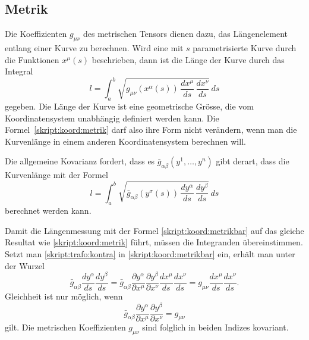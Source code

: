 \subsection{Metrik}
Die Koeffizienten $g_{\mu\nu}$ des metrischen Tensors dienen dazu,
das Längenelement entlang einer Kurve zu berechnen.
Wird eine mit $s$ parametrisierte Kurve durch die Funktionen
$x^\mu(s)$ beschrieben, dann ist die Länge der Kurve durch das
Integral
\begin{equation}
l = \int_a^b
\sqrt{g_{\mu\nu}(x^\alpha(s))\,\frac{dx^\mu}{ds}\,\frac{dx^\nu}{ds}}
\,ds
\label{skript:koord:metrik}
\end{equation}
gegeben.
Die Länge der Kurve ist eine geometrische Grösse, die vom Koordinatensystem 
unabhängig definiert werden kann.
Die Formel~\eqref{skript:koord:metrik} darf also ihre Form nicht verändern,
wenn man die Kurvenlänge in einem anderen Koordinatensystem berechnen will.

Die allgemeine Kovarianz fordert, dass es $\bar g_{\alpha\beta}(y^1,\dots,y^n)$
gibt derart, dass die Kurvenlänge mit der Formel
\begin{equation}
l = \int_a^b
\sqrt{\bar g_{\alpha\beta}(y^\sigma(s))\,\frac{dy^\alpha}{ds}\,\frac{dy^\beta}{ds}}
\,ds
\label{skript:koord:metrikbar}
\end{equation}
berechnet werden kann.

Damit die Längenmessung mit der Formel
\eqref{skript:koord:metrikbar} auf das gleiche Resultat wie 
\eqref{skript:koord:metrik} führt, müssen die Integranden übereinstimmen.
Setzt man \eqref{skript:trafo:kontra} in \eqref{skript:koord:metrikbar}
ein, erhält man unter der Wurzel
\begin{equation*}
\bar g_{\alpha\beta}
\frac{dy^\alpha}{ds}\frac{dy^\beta}{ds}
=
\bar g_{\alpha\beta}
\frac{\partial y^\alpha}{\partial x^\mu}
\frac{\partial y^\beta}{\partial x^\nu}
\frac{dx^\mu}{ds}\frac{dx^\nu}{ds}
=
g_{\mu\nu}
\frac{dx^\mu}{ds}\frac{dx^\nu}{ds}.
\end{equation*}
Gleichheit ist nur möglich, wenn
\begin{equation}
\bar g_{\alpha\beta}
\frac{\partial y^\alpha}{\partial x^\mu}
\frac{\partial y^\beta}{\partial x^\nu}
=
g_{\mu\nu}
\end{equation}
gilt.
Die metrischen Koeffizienten $g_{\mu\nu}$ sind folglich in beiden
Indizes kovariant.

